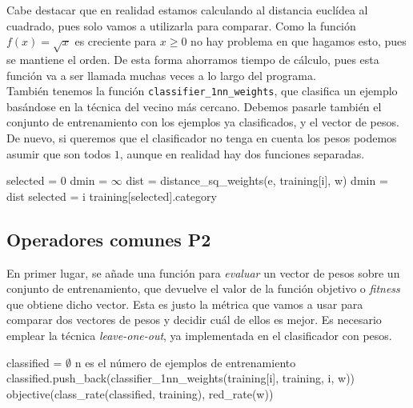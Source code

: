 \documentclass[12pt]{article}
\begin{document}
Cabe destacar que en realidad estamos calculando al distancia euclídea al cuadrado, pues solo vamos a utilizarla para comparar. Como la función $f(x)=\sqrt{x}$ es creciente para $x\geq 0$ no hay problema en que hagamos esto, pues se mantiene el orden. De esta forma ahorramos tiempo de cálculo, pues esta función va a ser llamada muchas veces a lo largo del programa.\\

También tenemos la función \verb|classifier_1nn_weights|, que clasifica un ejemplo basándose en la técnica del vecino más cercano. Debemos pasarle también el conjunto de entrenamiento con los ejemplos ya clasificados, y el vector de pesos. De nuevo, si queremos que el clasificador no tenga en cuenta los pesos podemos asumir que son todos $1$, aunque en realidad hay dos funciones separadas.

\begin{algorithm}[h]
\begin{algorithmic}

     \State selected = $0$
     \State dmin = $\infty$
       
            \State dist = distance\_sq\_weights(e, training[i], w)
                \State dmin = dist
                \State selected = i
            \EndIf
         \EndIf
     \EndFor
     \State \Return training[selected].category
\EndFunction

\end{algorithmic}
\end{algorithm}

\subsection*{Operadores comunes P2}
\label{comunes}

En primer lugar, se añade una función para \textit{evaluar} un vector de pesos sobre un conjunto de entrenamiento, que devuelve el valor de la función objetivo o \textit{fitness} que obtiene dicho vector. Esta es justo la métrica que vamos a usar para comparar dos vectores de pesos y decidir cuál de ellos es mejor. Es necesario emplear la técnica \textit{leave-one-out}, ya implementada en el clasificador con pesos.

\begin{algorithm}[ht]
\begin{algorithmic}

    \State classified = $\emptyset$
      \Comment n es el número de ejemplos de entrenamiento
        \State classified.push\_back(classifier\_1nn\_weights(training[i], training, i, w)) 
    \EndFor  
\State \Return objective(class\_rate(classified, training), red\_rate(w))
\EndFunction

\end{algorithmic}
\end{algorithm}
\end{document}
